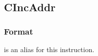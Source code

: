 \clearpage
{}
{}
\subsection*{CIncAddr}

\subsubsection*{Format}


\begin{center}
\rvcheriheader
{}
\end{center}

 is an alias for this instruction.

